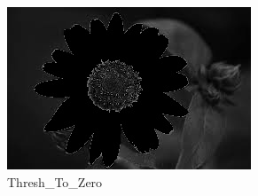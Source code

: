 \documentclass[]{article}
\begin{document}
\begin{enumerate}
	\begin{figure}[h]
		\centering
	  	\includegraphics{ThreshToZeroInv.jpg}
	  	\caption{Thresh\_To\_Zero}
	\end{figure}
	
\end{enumerate}
\end{document}
